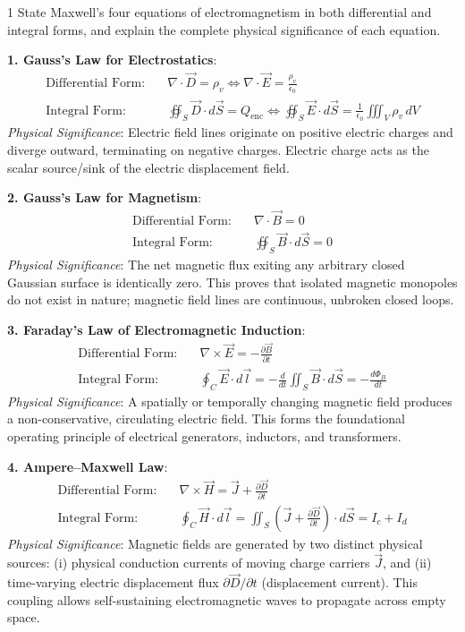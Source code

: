 \begin{theoryq}{1}
State Maxwell's four equations of electromagnetism in both differential and integral forms, and explain the complete physical significance of each equation.
\end{theoryq}
\begin{theorysol}
\textbf{1. Gauss's Law for Electrostatics}:
\begin{align*}
\text{Differential Form:}\quad &\nabla \cdot \vec{D} = \rho_v \iff \nabla \cdot \vec{E} = \frac{\rho_v}{\epsilon_0} \\
\text{Integral Form:}\quad &\oiint_S \vec{D}\cdot d\vec{S} = Q_{\text{enc}} \iff \oiint_S \vec{E}\cdot d\vec{S} = \frac{1}{\epsilon_0}\iiint_V \rho_v\,dV
\end{align*}
\textit{Physical Significance}: Electric field lines originate on positive electric charges and diverge outward, terminating on negative charges. Electric charge acts as the scalar source/sink of the electric displacement field.

\textbf{2. Gauss's Law for Magnetism}:
\begin{align*}
\text{Differential Form:}\quad &\nabla \cdot \vec{B} = 0 \\
\text{Integral Form:}\quad &\oiint_S \vec{B}\cdot d\vec{S} = 0
\end{align*}
\textit{Physical Significance}: The net magnetic flux exiting any arbitrary closed Gaussian surface is identically zero. This proves that isolated magnetic monopoles do not exist in nature; magnetic field lines are continuous, unbroken closed loops.

\textbf{3. Faraday's Law of Electromagnetic Induction}:
\begin{align*}
\text{Differential Form:}\quad &\nabla \times \vec{E} = -\frac{\partial \vec{B}}{\partial t} \\
\text{Integral Form:}\quad &\oint_C \vec{E}\cdot d\vec{l} = -\frac{d}{dt}\iint_S \vec{B}\cdot d\vec{S} = -\frac{d\Phi_B}{dt}
\end{align*}
\textit{Physical Significance}: A spatially or temporally changing magnetic field produces a non-conservative, circulating electric field. This forms the foundational operating principle of electrical generators, inductors, and transformers.

\textbf{4. Ampere--Maxwell Law}:
\begin{align*}
\text{Differential Form:}\quad &\nabla \times \vec{H} = \vec{J} + \frac{\partial \vec{D}}{\partial t} \\
\text{Integral Form:}\quad &\oint_C \vec{H}\cdot d\vec{l} = \iint_S \left(\vec{J} + \frac{\partial \vec{D}}{\partial t}\right)\cdot d\vec{S} = I_c + I_d
\end{align*}
\textit{Physical Significance}: Magnetic fields are generated by two distinct physical sources: (i) physical conduction currents of moving charge carriers $\vec{J}$, and (ii) time-varying electric displacement flux $\partial\vec{D}/\partial t$ (displacement current). This coupling allows self-sustaining electromagnetic waves to propagate across empty space.
\end{theorysol}
\vspace{4mm}

